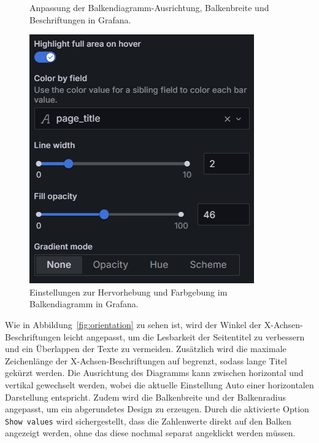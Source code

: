 \begin{figure}[H]
\begin{minipage}{0.49\textwidth}
        \caption{Anpassung der Balkendiagramm-Ausrichtung, Balkenbreite und Beschriftungen in Grafana.}
        \label{fig:orientation}
    \end{minipage}
    \hfill
    \begin{minipage}{0.49\textwidth}
        \centering
        \includegraphics[width=\linewidth, keepaspectratio]{images/highlight.png}
        \caption{Einstellungen zur Hervorhebung und Farbgebung im Balkendiagramm in Grafana.}
        \label{fig:highlight}
    \end{minipage}
\end{figure}

Wie in Abbildung~\ref{fig:orientation} zu sehen ist, wird der Winkel der X-Achsen-Beschriftungen leicht angepasst, um die Lesbarkeit der Seitentitel zu verbessern und ein Überlappen der Texte zu vermeiden. Zusätzlich wird die maximale Zeichenlänge der X-Achsen-Beschriftungen auf \grqq{} begrenzt, sodass lange Titel gekürzt werden. Die Ausrichtung des Diagramms kann zwischen horizontal und vertikal gewechselt werden, wobei die aktuelle Einstellung \glqq Auto\grqq{} einer horizontalen Darstellung entspricht. Zudem wird die Balkenbreite und der Balkenradius angepasst, um ein abgerundetes Design zu erzeugen. Durch die aktivierte Option \texttt{Show values} wird sichergestellt, dass die Zahlenwerte direkt auf den Balken angezeigt werden, ohne das diese nochmal separat angeklickt werden müssen.


